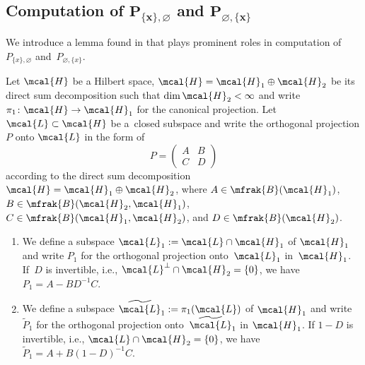 \subsection[Computation of P(x,0) and P(0,x)]{Computation of $\boldsymbol{P_{\{x\},\varnothing}}$ and $\boldsymbol{P_{\varnothing,\{x\}}}$}

We introduce a lemma found in \cite[Section~7]{BufetovOlshanski2019} that plays prominent roles in computation of~$P_{\{x\},\varnothing}$ and~$P_{\varnothing,\{x\}}$.
\begin{Lemma}\label{lem:projection_reduction_formula}
Let $\mcal{H}$ be a Hilbert space, $\mcal{H}=\mcal{H}_{1}\oplus \mcal{H}_{2}$ be its direct sum decomposition such that $\dim \mcal{H}_{2}<\infty$ and write $\pi_{1}\colon \mcal{H}\to\mcal{H}_{1}$ for the canonical projection. Let $\mcal{L}\subset \mcal{H}$ be a~closed subspace and write the orthogonal projection $P$ onto $\mcal{L}$ in the form of
\begin{equation*}
	P=\left(
	\begin{matrix}
	A & B \\
	C & D
	\end{matrix}
	\right)
\end{equation*}
according to the direct sum decomposition $\mcal{H}=\mcal{H}_{1}\oplus \mcal{H}_{2}$, where $A\in \mfrak{B}(\mcal{H}_{1})$, $B\in \mfrak{B}(\mcal{H}_{2},\mcal{H}_{1})$, $C\in \mfrak{B}(\mcal{H}_{1},\mcal{H}_{2})$, and $D\in \mfrak{B}(\mcal{H}_{2})$.
\begin{enumerate}\itemsep=0pt
\item[$1.$] 	We define a subspace $\mcal{L}_{1}:=\mcal{L}\cap \mcal{H}_{1}$ of $\mcal{H}_{1}$ and write $P_{1}$ for the orthogonal projection onto~$\mcal{L}_{1}$ in~$\mcal{H}_{1}$. If~$D$ is invertible, i.e., $\mcal{L}^{\perp}\cap\mcal{H}_{2}=\{0\}$, we have $P_{1}=A-BD^{-1}C$.
\item[$2.$] 	We define a subspace $\widetilde{\mcal{L}}_{1}:=\pi_{1}(\mcal{L})$ of $\mcal{H}_{1}$ and write $\widetilde{P}_{1}$ for the orthogonal projection onto~$\widetilde{\mcal{L}}_{1}$ in $\mcal{H}_{1}$. If $1-D$ is invertible, i.e., $\mcal{L}\cap\mcal{H}_{2}=\{0\}$, we have $\widetilde{P}_{1}=A+B(1-D)^{-1}C$.
\end{enumerate}
\end{Lemma}
